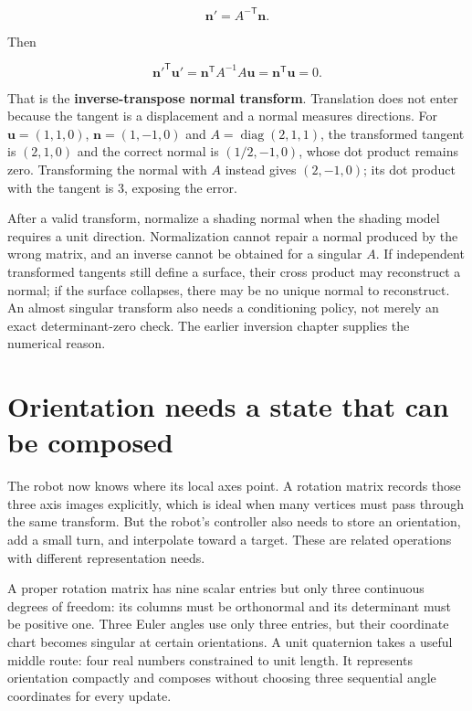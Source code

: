 \[
\mathbf n'=A^{-\mathsf T}\mathbf n.
\]

Then

\[
\mathbf n'^{\mathsf T}\mathbf u'
=\mathbf n^{\mathsf T}A^{-1}A\mathbf u
=\mathbf n^{\mathsf T}\mathbf u=0.
\]

That is the \textbf{inverse-transpose normal transform}. Translation does not enter because the tangent is a displacement and a normal measures directions. For \(\mathbf u=(1,1,0)\), \(\mathbf n=(1,-1,0)\) and \(A=\operatorname{diag}(2,1,1)\), the transformed tangent is \((2,1,0)\) and the correct normal is \((1/2,-1,0)\), whose dot product remains zero. Transforming the normal with \(A\) instead gives \((2,-1,0)\); its dot product with the tangent is \(3\), exposing the error.

After a valid transform, normalize a shading normal when the shading model requires a unit direction. Normalization cannot repair a normal produced by the wrong matrix, and an inverse cannot be obtained for a singular \(A\). If independent transformed tangents still define a surface, their cross product may reconstruct a normal; if the surface collapses, there may be no unique normal to reconstruct. An almost singular transform also needs a conditioning policy, not merely an exact determinant-zero check. The earlier inversion chapter supplies the numerical reason.

\section{Orientation needs a state that can be composed}\label{01-foundations-i-ch019-orientation-needs-a-state-that-can-be-composed}

The robot now knows where its local axes point. A rotation matrix records those three axis images explicitly, which is ideal when many vertices must pass through the same transform. But the robot's controller also needs to store an orientation, add a small turn, and interpolate toward a target. These are related operations with different representation needs.

A proper rotation matrix has nine scalar entries but only three continuous degrees of freedom: its columns must be orthonormal and its determinant must be positive one. Three Euler angles use only three entries, but their coordinate chart becomes singular at certain orientations. A unit quaternion takes a useful middle route: four real numbers constrained to unit length. It represents orientation compactly and composes without choosing three sequential angle coordinates for every update.

